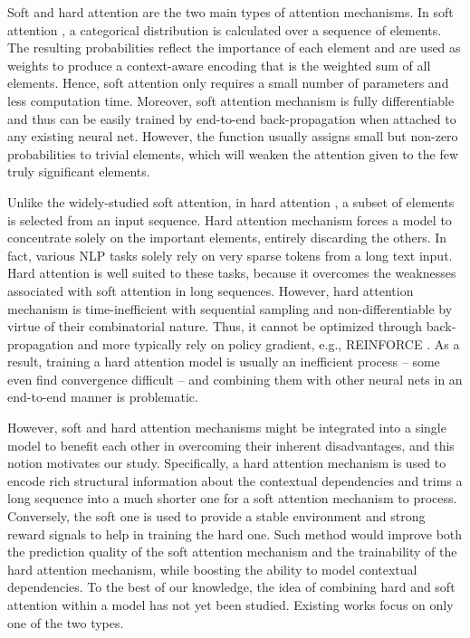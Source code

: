 \documentclass{article}
\begin{document}
Soft and hard attention are the two main types of attention mechanisms. In soft attention \cite{bahdanau2015neural}, a categorical distribution is calculated over a sequence of elements. The resulting probabilities reflect the importance of each element and are used as weights to produce a context-aware encoding that is the weighted sum of all elements. Hence, soft attention only requires a small number of parameters and less computation time. Moreover, soft attention mechanism is fully differentiable and thus can be easily trained by end-to-end back-propagation when attached to any existing neural net. However, the  function  usually assigns small but non-zero probabilities to trivial elements, which will weaken the attention given to the few truly significant elements. 

Unlike the widely-studied soft attention, in hard attention \cite{xu2015show}, a subset of elements is selected from an input sequence. Hard attention mechanism forces a model to concentrate solely on the important elements, entirely discarding the others. In fact, various NLP tasks solely rely on very sparse tokens from a long text input. Hard attention is well suited to these tasks, because it overcomes the weaknesses associated with soft attention in long sequences. However, hard attention mechanism is time-inefficient with sequential sampling and non-differentiable by virtue of their combinatorial nature. Thus, it cannot be optimized through back-propagation and more typically rely on policy gradient, e.g., REINFORCE \cite{williams1992simple}. As a result, training a hard attention model is usually an inefficient process – some even find convergence difficult – and combining them with other neural nets in an end-to-end manner is problematic.

However, soft and hard attention mechanisms might be integrated into a single model to benefit each other in overcoming their inherent disadvantages, and this notion motivates our study. Specifically, a hard attention mechanism is used to encode rich structural information about the contextual dependencies and trims a long sequence into a much shorter one for a soft attention mechanism to process. Conversely, the soft one is used to provide a stable environment and strong reward signals to help in training the hard one. Such method would improve both the prediction quality of the soft attention mechanism and the trainability of the hard attention mechanism, while boosting the ability to model contextual dependencies. 
To the best of our knowledge, the idea of combining hard and soft attention within a model has not yet been studied.  Existing works focus on only one of the two types.
\end{document}
